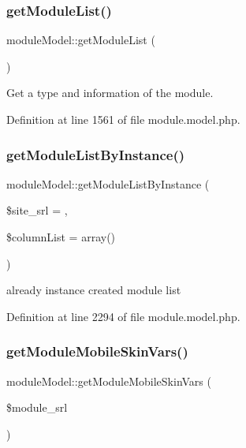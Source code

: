 \subsubsection{\texorpdfstring{get\+Module\+List()}{getModuleList()}}
{\footnotesize\ttfamily module\+Model\+::get\+Module\+List (\begin{DoxyParamCaption}{ }\end{DoxyParamCaption})}



Get a type and information of the module. 



Definition at line 1561 of file module.\+model.\+php.

\hypertarget{classmoduleModel_a29d890e1acd36f429ff2411533104c8b}{}\label{classmoduleModel_a29d890e1acd36f429ff2411533104c8b} 
\subsubsection{\texorpdfstring{get\+Module\+List\+By\+Instance()}{getModuleListByInstance()}}
{\footnotesize\ttfamily module\+Model\+::get\+Module\+List\+By\+Instance (\begin{DoxyParamCaption}\item[{}]{\$site\+\_\+srl = {},  }\item[{}]{\$column\+List = {\ttfamily array()} }\end{DoxyParamCaption})}



already instance created module list 



Definition at line 2294 of file module.\+model.\+php.

\hypertarget{classmoduleModel_aef7f4760b4c1864752d1042e1a0667c8}{}\label{classmoduleModel_aef7f4760b4c1864752d1042e1a0667c8} 
\subsubsection{\texorpdfstring{get\+Module\+Mobile\+Skin\+Vars()}{getModuleMobileSkinVars()}}
{\footnotesize\ttfamily module\+Model\+::get\+Module\+Mobile\+Skin\+Vars (\begin{DoxyParamCaption}\item[{}]{\$module\+\_\+srl }\end{DoxyParamCaption})}

